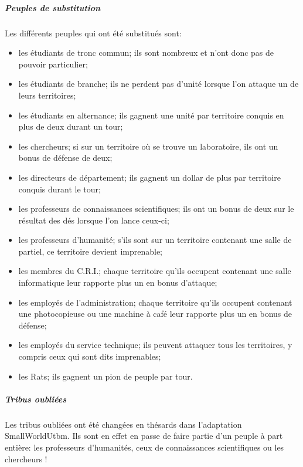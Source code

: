 \documentclass[a4paper, 11pt]{article}
\begin{document}
		\subparagraph{Peuples de substitution}
		Les différents peuples qui ont été substitués sont:
		\begin{itemize}
			\item les étudiants de tronc commun; ils sont nombreux et n'ont donc pas de pouvoir particulier;
			\item les étudiants de branche; ils ne perdent pas d'unité lorsque l'on attaque un de leurs territoires;
			\item les étudiants en alternance; ils gagnent une unité par territoire conquis en plus de deux durant un tour;
			\item les chercheurs; si sur un territoire où se trouve un laboratoire, ils ont un bonus de défense de deux;
			\item les directeurs de département; ils gagnent un dollar de plus par territoire conquis durant le tour;
			\item les professeurs de connaissances scientifiques; ils ont un bonus de deux sur le résultat des dés lorsque l'on lance ceux-ci;
			\item les professeurs d'humanité; s'ils sont sur un territoire contenant une salle de partiel, ce territoire devient imprenable;
			\item les membres du C.R.I.; chaque territoire qu'ils occupent contenant une salle informatique leur rapporte plus un en bonus d'attaque;
			\item les employés de l'administration; chaque territoire qu'ils occupent contenant une photocopieuse ou une machine à café leur rapporte plus un en bonus de défense;
			\item les employés du service technique; ils peuvent attaquer tous les territoires, y compris ceux qui sont dits imprenables;
			\item les Rats; ils gagnent un pion de peuple par tour.
		\end{itemize}
		
		\subparagraph{Tribus oubliées}
		Les tribus oubliées ont été changées en thésards dans l'adaptation SmallWorldUtbm. Ils sont en effet en passe de faire partie d'un peuple à part entière: les professeurs d'humanités, ceux de connaissances scientifiques ou les chercheurs !
		
\end{document}
